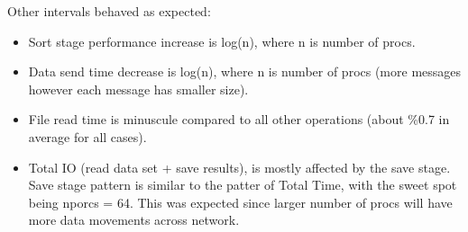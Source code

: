 \documentclass{article}
\begin{document}
\vspace{0.5cm}

Other intervals behaved as expected:

\begin{itemize}
\item Sort stage performance increase is log(n), where n is number of procs. 
\item Data send time decrease is log(n), where n is number of procs (more messages however
each message has smaller size).
\item File read time is minuscule compared to all other operations (about \%0.7 in average
for all cases).
\item Total IO (read data set + save results), is mostly affected by the save stage. Save
stage pattern is similar to the patter of Total Time, with the sweet spot being nporcs = 64.
This was expected since larger number of procs will have more data movements across network.
\end{itemize}
\end{document}
